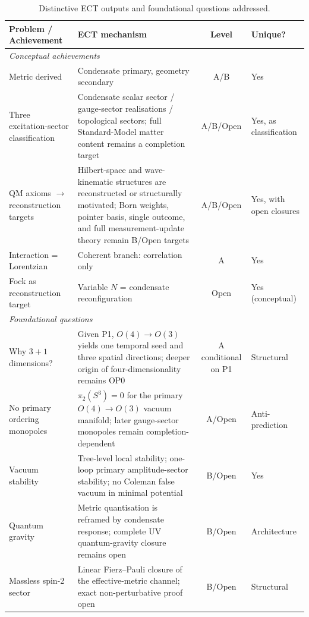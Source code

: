 \documentclass[11pt,a4paper]{article}
\begin{document}
\begin{table}[H]
\centering
\caption{Distinctive ECT outputs and foundational questions addressed.}
\label{tab:pop_distinctive}
\small
\renewcommand{\arraystretch}{1.15}
\begin{tabular}{@{}p{3.8cm}p{4.5cm}cp{2.2cm}@{}}
\toprule
Problem / Achievement & ECT mechanism & Level & Unique? \\
\midrule
\multicolumn{4}{l}{\textit{Conceptual achievements}} \\
\midrule
Metric derived & Condensate primary, geometry secondary & A/B & Yes \\
Three excitation-sector classification & Condensate scalar sector / gauge-sector realisations / topological sectors; full Standard-Model matter content remains a completion target & A/B/Open & Yes, as classification \\
QM axioms $\to$ reconstruction targets & Hilbert-space and wave-kinematic structures are reconstructed or structurally motivated; Born weights, pointer basis, single outcome, and full measurement-update theory remain B/Open targets & A/B/Open & Yes, with open closures \\
Interaction = Lorentzian & Coherent branch: correlation only & A & Yes \\
Fock as reconstruction target & Variable $N$ = condensate reconfiguration & Open & Yes (conceptual) \\
\midrule
\multicolumn{4}{l}{\textit{Foundational questions}} \\
\midrule
Why $3\!+\!1$ dimensions? & Given P1, $O(4)\!\to\!O(3)$ yields one temporal seed and three spatial directions; deeper origin of four-dimensionality remains OP0 & A conditional on P1 & Structural \\
No primary ordering monopoles & $\pi_2(S^3)=0$ for the primary $O(4)\to O(3)$ vacuum manifold; later gauge-sector monopoles remain completion-dependent & A/Open & Anti-prediction \\
Vacuum stability & Tree-level local stability; one-loop primary amplitude-sector stability; no Coleman false vacuum in minimal potential & B/Open & Yes \\
Quantum gravity & Metric quantisation is reframed by condensate response; complete UV quantum-gravity closure remains open & B/Open & Architecture \\
Massless spin-2 sector & Linear Fierz--Pauli closure of the effective-metric channel; exact non-perturbative proof open & B/Open & Structural \\

\end{tabular}
\end{table}
\end{document}
